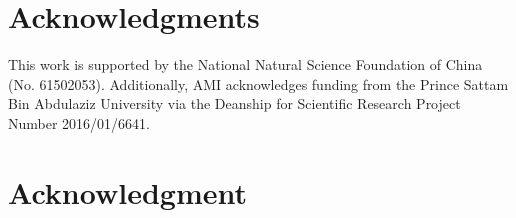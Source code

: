 \documentclass[10pt,journal,compsoc]{IEEEtran}
\begin{document}
  \section*{Acknowledgments}
  This work is supported by the National Natural Science Foundation of China (No. 61502053). Additionally, AMI acknowledges funding from the Prince Sattam Bin Abdulaziz University via the Deanship for Scientific Research Project Number 2016/01/6641.

\else
  \section*{Acknowledgment}
\fi

\ifCLASSOPTIONcaptionsoff
  \newpage
\fi

\end{document}
